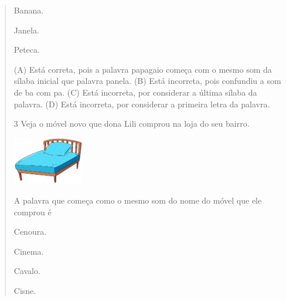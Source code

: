 \begin{verse}
\begin{minipage}{.5\textwidth}
\begin{escolha}
\item Banana.

\item Janela.

\item Peteca.
\end{escolha}
\end{minipage}

(A) Está correta, pois a palavra papagaio começa com o mesmo som da
sílaba inicial que palavra panela.
(B) Está incorreta, pois confundiu a som de ba com pa.
(C) Está incorreta, por considerar a última sílaba da palavra.
(D) Está incorreta, por considerar a primeira letra da palavra.

\num{3} Veja o móvel novo que dona Lili comprou na loja do seu bairro.

\includegraphics[width=1.22293in,height=0.81839in]{media/image140.jpeg}


A palavra que começa como o mesmo som do nome do móvel que ele comprou é

\begin{minipage}{.5\textwidth}
\begin{escolha}
\item Cenoura.

\item Cinema.

\item Cavalo.

\item Cisne.
\end{escolha}
\end{minipage}
\end{verse}
